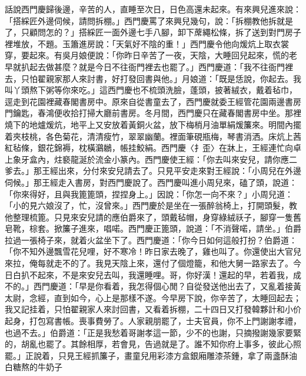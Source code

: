 \begin{showcontents}{}
話說西門慶歸後邊，辛苦的人，直睡至次日，日色高還未起來。有來興兒進來說：「搭綵匠外邊伺候，請問拆棚。」西門慶罵了來興兒幾句，說：「拆棚教他拆就是了，只顧問怎的？」搭綵匠一面外邊七手八腳，卸下蓆繩松條，拆了送到對門房子裡堆放，不題。玉簫進房說：「天氣好不陰的重！」西門慶令他向煖炕上取衣裳穿，要起來。有吳月娘便說：「你昨日辛苦了一夜，天陰，大睡回兒起來，慌的老早就扒起去做甚麼？就是今日不往衙門裡去也罷了。」西門慶道：「我不往衙門裡去，只怕翟親家那人來討書，好打發回書與他。」月娘道：「既是恁說，你起去。我叫丫頭熬下粥等你來吃。」這西門慶也不梳頭洗臉，蓬頭，披著絨衣，戴着毡巾，逕走到花園裡藏春閣書房中。原來自從書童去了，西門慶就委王經管花園兩邊書房門鑰匙，春鴻便收拾打掃大廳前書房。冬月間，西門慶只在藏春閣書房中坐。那裡燒下的地爐煖炕，地平上又安放着黃銅火盆，放下梅梢月油單絹煖簾來。明間內擺着夾枝桃，各色菊花，清清瘦竹，翠翠幽蘭。裡面筆硯瓶梅，琴書消洒。床炕上茜紅毡條，銀花錦褥，枕橫鸂鶒，帳挂鮫絹。西門慶〈扌歪〉在牀上，王經連忙向卓上象牙盒內，炷褻龍涎於流金小篆內。西門慶使王經：「你去叫來安兒，請你應二爹去。」那王經出來，分付來安兒請去了。只見平安走來對王經說：「小周兒在外邊伺候。」那王經走入書房，對西門慶說了。西門慶叫進小周兒來，磕了頭，說道：「你來得好，且與我篦篦頭，捏捏身上。」因說：「你怎一向不來？」小周兒道：「小的見六娘沒了，忙，沒曾來。」西門慶於是坐在一張醉翁椅上，打開頭髮，教他整理梳篦。只見來安兒請的應伯爵來了，頭戴毡帽，身穿綠絨祅子，腳穿一隻舊皂靴，棕套。掀簾子進來，唱喏。西門慶正篦頭，說道：「不消聲喏，請坐。」伯爵拉過一張椅子來，就着火盆坐下了。西門慶道：「你今日如何這般打扮？伯爵道：「你不知外邊飄雪花兒哩，好不寒冷！昨日家去晚了，雞也叫了。你還使出大官兒來拉，俺每就走不的了。我見天陰上來，還付了個燈籠，和他大舅一路家去了。今日白扒不起來，不是來安兒去叫，我還睡哩。哥，你好漢！還起的早，若着我，成不的。」西門慶道：「早是你看着，我怎得個心閒？自從發送他出去了，又亂着接黃太尉，念經，直到如今，心上是那樣不遂。今早房下說，你辛苦了，太睡回起去；我又記挂着，只怕翟親家人來討回書，又看着拆棚，二十四日又打發韓夥計和小价起身，打包寫書帳。喪事費勞了。人家親朋罷了，士夫官員，你不上門謝謝孝禮，也過不去。」伯爵道：「正是我愁着哥謝孝這一節，少不的也謝，只摘撥謝幾家要緊的，胡亂也罷了。其餘相厚，若會見，告過就是了。誰不知你府上事多，彼此心照罷。」正說着，只見王經抓簾子，畫童兒用彩漆方盒銀廂雕漆茶鍾，拿了兩盞酥油白糖熬的牛奶子 
\end{showcontents}
